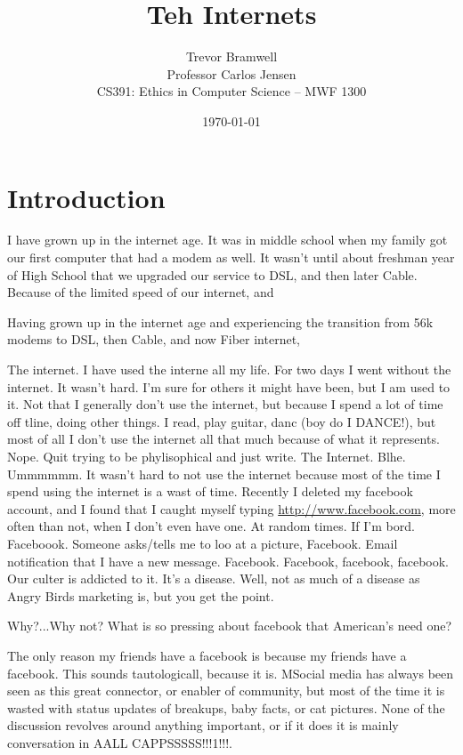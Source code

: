\documentclass[12pt,letterpaper]{article}
\title{Teh Internets}
\author{
    Trevor Bramwell\\
    Professor Carlos Jensen\\
    CS391: Ethics in Computer Science -- MWF 1300\\
}
\date{\today}
\begin{document}
\maketitle

\section{Introduction}
I have grown up in the internet age. It was in  middle school when my
family got our first computer that had a modem as well. It wasn't until
about freshman year of High School that we upgraded our service to DSL,
and then later Cable. Because of the limited speed of our internet, and 

Having grown up in the internet age and experiencing the transition from
56k modems to DSL, then Cable, and now Fiber internet,  

The internet. I have used the interne all my life. For two days I went
without the internet. It wasn't hard. I'm sure for others it might have
been, but I am used to it. Not that I generally don't use the internet,
but because I spend a lot of time off tline, doing other things. I read,
play guitar, danc (boy do I DANCE!), but most of all I don't use the
internet all that much because of what it represents. Nope. Quit trying
to be phylisophical and just write. The Internet. Blhe. Ummmmmm. It
wasn't hard to not use the internet because most of the time I spend
using the internet is a wast of time. Recently I deleted my facebook
account, and I found that I caught myself typing \url{http://www.facebook.com}, more
often than not, when I don't even have one. At random times. If I'm
bord. Faceboook. Someone asks/tells me to loo at a picture, Facebook.
Email notification that I have a new message. Facebook. Facebook,
facebook, facebook. Our culter is addicted to it. It's a disease. Well,
not as much of a disease as Angry Birds marketing is, but you get the
point. 

 Why?...Why not? What is so pressing about
facebook that American's need one? 

The only reason my friends have a facebook is because my friends have a
facebook. This sounds tautologicall, because it is. MSocial media has
always been seen as this great connector, or enabler of community, but
most of the time it is wasted  with status updates of breakups, baby
facts, or cat pictures. None of the discussion revolves around anything
important, or if it does it is mainly conversation in AALL
CAPPSSSSS!!!1!!!.
\end{document}
